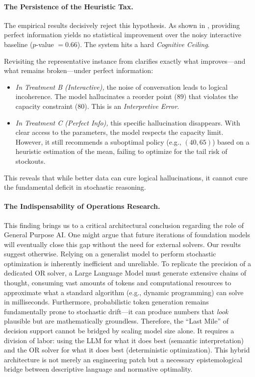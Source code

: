 \paragraph{The Persistence of the Heuristic Tax.}The empirical results decisively reject this hypothesis. As shown in , providing perfect information yields no statistical improvement over the noisy interactive baseline ($p$-value $= 0.66$). The system hits a hard \emph{Cognitive Ceiling}.

Revisiting the representative instance from  clarifies exactly what improves—and what remains broken—under perfect information:
\begin{itemize}
\item \emph{In Treatment B (Interactive),} the noise of conversation leads to logical incoherence. The model hallucinates a reorder point ($89$) that violates the capacity constraint ($80$). This is an \emph{Interpretive Error}.
\item \emph{In Treatment C (Perfect Info),} this specific hallucination disappears. With clear access to the parameters, the model respects the capacity limit. However, it still recommends a suboptimal policy (e.g., $(40, 65)$) based on a heuristic estimation of the mean, failing to optimize for the tail risk of stockouts.
\end{itemize}
This reveals that while better data can cure logical hallucinations, it cannot cure the fundamental deficit in stochastic reasoning.
\vspace{.5em}

\paragraph{The Indispensability of Operations Research.}This finding brings us to a critical architectural conclusion regarding the role of General Purpose AI. One might argue that future iterations of foundation models will eventually close this gap without the need for external solvers. Our results suggest otherwise.
Relying on a generalist model to perform stochastic optimization is inherently inefficient and unreliable. To replicate the precision of a dedicated OR solver, a Large Language Model must generate extensive chains of thought, consuming vast amounts of tokens and computational resources to approximate what a standard algorithm (e.g., dynamic programming) can solve in milliseconds. Furthermore, probabilistic token generation remains fundamentally prone to stochastic drift—it can produce numbers that \emph{look} plausible but are mathematically groundless.
Therefore, the ``Last Mile'' of decision support cannot be bridged by scaling model size alone. It requires a division of labor: using the LLM for what it does best (semantic interpretation) and the OR solver for what it does best (deterministic optimization). This hybrid architecture is not merely an engineering patch but a necessary epistemological bridge between descriptive language and normative optimality.




